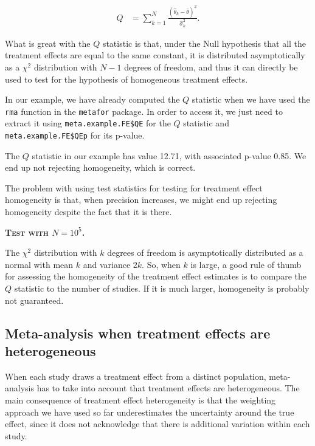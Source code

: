 \documentclass[]{book}
\theoremstyle{definition}
\theoremstyle{definition}
\theoremstyle{definition}
\theoremstyle{remark}
\let\BeginKnitrBlock\begin \let\EndKnitrBlock\end
\begin{document}
\begin{align*}
  Q & = \sum_{k=1}^N\frac{(\hat{\theta}_k-\bar{\theta})^2}{\hat{\sigma}^2_k}.
\end{align*}

What is great with the \(Q\) statistic is that, under the Null
hypothesis that all the treatment effects are equal to the same
constant, it is distributed asymptotically as a \(\chi^2\) distribution
with \(N-1\) degrees of freedom, and thus it can directly be used to
test for the hypothesis of homogeneous treatment effects.

\BeginKnitrBlock{example}
\protect\hypertarget{exm:unnamed-chunk-144}{}{\label{exm:unnamed-chunk-144}
}In our example, we have already computed the \(Q\) statistic when we
have used the \texttt{rma} function in the \texttt{metafor} package. In
order to access it, we just need to extract it using
\texttt{meta.example.FE\$QE} for the \(Q\) statistic and
\texttt{meta.example.FE\$QEp} for its p-value.
\EndKnitrBlock{example} The \(Q\) statistic in our example has value
12.71, with associated p-value 0.85. We end up not rejecting
homogeneity, which is correct.

\BeginKnitrBlock{remark}
\iffalse{} {Remark. } \fi{}The problem with using test statistics for
testing for treatment effect homogeneity is that, when precision
increases, we might end up rejecting homogeneity despite the fact that
it is there.
\EndKnitrBlock{remark}

\textbf{\textsc{Test with \(N=10^5\).}}

\BeginKnitrBlock{remark}
\iffalse{} {Remark. } \fi{}The \(\chi^2\) distribution with \(k\)
degrees of freedom is asymptotically distributed as a normal with mean
\(k\) and variance \(2k\). So, when \(k\) is large, a good rule of thumb
for assessing the homogeneity of the treatment effect estimates is to
compare the \(Q\) statistic to the number of studies. If it is much
larger, homogeneity is probably not guaranteed.
\EndKnitrBlock{remark}

\subsection{Meta-analysis when treatment effects are
heterogeneous}\label{meta-analysis-when-treatment-effects-are-heterogeneous}

When each study draws a treatment effect from a distinct population,
meta-analysis has to take into account that treatment effects are
heterogeneous. The main consequence of treatment effect heterogeneity is
that the weighting approach we have used so far underestimates the
uncertainty around the true effect, since it does not acknowledge that
there is additional variation within each study.
\end{document}
